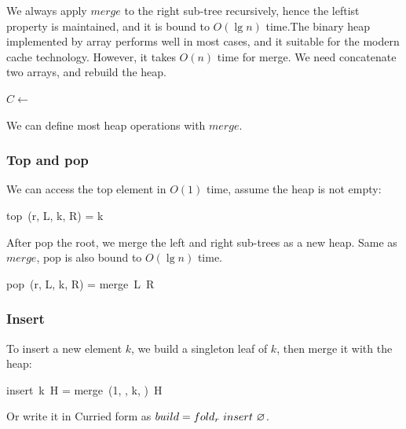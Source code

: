 \documentclass[b5paper]{article}
\begin{document}
We always apply $merge$ to the right sub-tree recursively, hence the leftist property is maintained, and it is bound to $O(\lg n)$ time.The binary heap implemented by array performs well in most cases, and it suitable for the modern cache technology. However, it takes $O(n)$ time for merge. We need concatenate two arrays, and rebuild the heap\cite{NIST}.

\begin{algorithmic}[1]
  \State $C \gets$ 
  \State {}
\EndFunction
\end{algorithmic}

We can define most heap operations with $merge$.

\subsubsection{Top and pop}
 

We can access the top element in $O(1)$ time, assume the heap is not empty:

\be
top\ (r, L, k, R) = k
\ee

After pop the root, we merge the left and right sub-trees as a new heap. Same as $merge$, pop is also bound to $O(\lg n)$ time.

\be
pop\ (r, L, k, R) = merge\ L\ R
\ee

\subsubsection{Insert}

To insert a new element $k$, we build a singleton leaf of $k$, then merge it with the heap:

\be
insert\ k\ H = merge\ (1, \nil, k, \nil)\ H
\ee

Or write it in Curried form as $build = fold_r\ insert\ \varnothing$.
\end{document}
